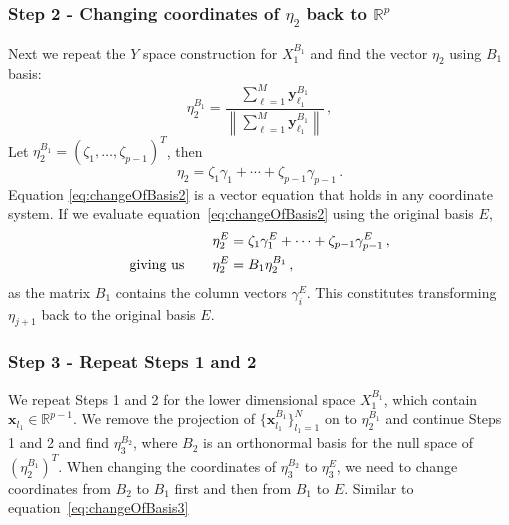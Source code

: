 \documentclass[letter,12pt]{article}
\begin{document}
{\subsubsection{Step 2 - Changing coordinates of $\eta_2$ back to $\mathbb{R}^p$ }

Next we repeat the $Y$ space construction for $X_1^{B_1}$ and find the vector $\eta_2$ using $B_1$ basis: %
\begin{equation}\label{eq:secMF11}
	\eta_2^{B_1} = \frac{\sum_{\ell=1}^M \bm{y}_{\ell_1}^{B_1} }{ \left\lVert\sum_{\ell=1}^M \bm{y}_{\ell_1}^{B_1}\right\rVert }\,,
\end{equation}
Let $\eta_2^{B_1} = \left( \zeta_1, \ldots, \zeta_{p-1} \right)^T$, then 
\begin{equation}\label{eq:changeOfBasis2}
    \eta_2 = \zeta_1 \gamma_1 + \cdots + \zeta_{p-1}\gamma_{p-1} \, .
\end{equation}
Equation \eqref{eq:changeOfBasis2} is a vector equation that holds in any coordinate system. If we evaluate  equation~\eqref{eq:changeOfBasis2} using the original basis $E$, %
\begin{align}\label{eq:changeOfBasis3}
    \eta_2^{E} & = \zeta_1 \gamma_1^E + \cdots + \zeta_{p-1}\gamma_{p-1}^E \, , \notag \\
 \text{giving us} \qquad    \eta_2^{E} &=  B_1 \eta_2^{B_1} \, ,
\end{align}
as the matrix $B_1$ contains the column vectors $\gamma_i^E$. This constitutes transforming $\eta_{j+1}$ back to the original basis $E$. 
\subsubsection{Step 3 - Repeat Steps 1 and 2}
We repeat Steps 1 and 2 for the lower dimensional space $X_1^{B_1}$, which contain $\bm{x}_{l_1} \in \mathbb{R}^{p-1}$. We remove the projection of $\{\bm{x}_{l_1}^{B_1}\}_{l_1 = 1}^N$ on to $\eta_2^{B_1}$ and continue Steps 1 and 2 and find $\eta_3^{B_2}$, where $B_2$ is an orthonormal basis for the null space of $\left(\eta_2^{B_1}\right)^T$. When changing the coordinates of $\eta_3^{B_2}$ to $\eta_3^{E}$, we need to change coordinates from $B_2$ to $B_1$ first and then from $B_1$ to $E$. Similar to equation~\eqref{eq:changeOfBasis3}
 
}
\end{document}
